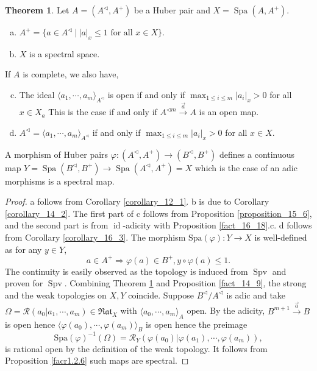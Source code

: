 \documentclass[10pt]{article}
\numberwithin{equation}{section}
\theoremstyle{definition}
\newtheorem{theorem}{Theorem} [subsection]
\DeclareMathOperator{\id}{id}
\DeclareMathOperator{\Spa}{Spa}
\DeclareMathOperator{\Spv}{Spv}
\newcommand{\cR}[0]{\mathcal{R}}
\newcommand{\sep}[0]{\:|\:}
\newcommand{\ab}[1]{\vert #1 \vert}
\newcommand{\Rat}[0]{\mathfrak{Rat}}
\begin{document}
\begin{theorem}
    \label{theorem_17_2}
    Let $A=(A^\triangleleft,A^+)$ be a Huber pair and $X=\Spa (A,A^+)$.
    \begin{enumerate}[a.]
        \item $A^+=\{a\in A^\triangleleft\sep \ab{a}_x\leq 1\text{ for all $x\in X$}\}$.
        \item $X$ is a spectral space.
    \end{enumerate}
    If $A$ is complete, we also have,
    \begin{enumerate}[a.]
        \setcounter{enumi}{2}
        \item The ideal $\langle a_1,\cdots,a_m\rangle_{A^\triangleleft}$ is open if and only if $\max_{1\leq i\leq m}\ab{a_i}_x>0$ for all $x\in X_a$
        This is the case if and only if $A^{\triangleleft m}\stackrel{\vec{a}}{\to}A$ is an open map.
        \item $A^{\triangleleft}=\langle a_1,\cdots,a_m\rangle_{A^\triangleleft}$ if and only if $\max_{1\leq i\leq m}\ab{a_i}_x>0$ for all $x\in X$.
    \end{enumerate}
    A morphism of Huber pairs $\varphi:(A^\triangleleft,A^+)\to (B^\triangleleft, B^+)$ defines a continuous map $Y=\Spa (B^\triangleleft,B^+)\to \Spa (A^\triangleleft, A^+)=X$ which is the case of an adic morphisms is a spectral map.
\end{theorem}

\begin{proof}
    a follows from Corollary \ref{corollary_12_1}. b is due to Corollary \ref{corollary_14_2}.
    The first part of c follows from Proposition \ref{proposition_15_6}, and the second part is from $\id$-adicity with Proposition \ref{fact_16_18}.c.
    d follows from Corollary \ref{corollary_16_3}.
    The morphism $\mathrm{Spa}(\varphi):Y\to X$ is well-defined as for any $y\in Y$,
    \begin{equation*}
        a\in A^+\Rightarrow \varphi(a)\in B^+, y\circ\varphi(a)\leq 1.
    \end{equation*}
    The continuity is easily observed as the topology is induced from $\Spv$ and proven for $\Spv$.
    Combining Theorem \ref{theorem_17_2} and Proposition \ref{fact_14_9}, the strong and the weak topologies on $X,Y$ coincide.
    Suppose $B^{\triangleleft}/A^{\triangleleft}$ is adic and take $\Omega=\cR(a_0|a_1,\cdots,a_m)\in\Rat_X$ with $\langle a_0,\cdots,a_m\rangle_A$ open.
    By the adicity, $B^{m+1}\stackrel{\vec{a}}{\to}B$ is open hence $\langle \varphi(a_0),\cdots,\varphi(a_m)\rangle_B$ is open hence the preimage
    \begin{equation*}
        \mathrm{Spa}(\varphi)^{-1}(\Omega) = \cR_Y(\varphi(a_0)|\varphi(a_1),\cdots,\varphi(a_m)),
    \end{equation*}
    is rational open by the definition of the weak topology. It follows from Proposition \ref{facr1.2.6} such maps are spectral.
\end{proof}
\end{document}
